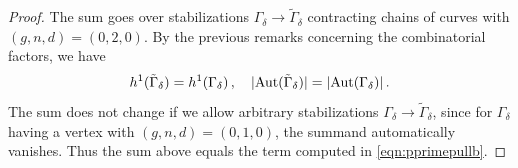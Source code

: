 \documentclass[a4paper,12pt]{article} %
\newcommand{\ca}[1]{{\mathcal{#1}}}
\newcommand{\bd}[1]{{\mathbf{#1}}}
\def\Aut{{\rm Aut}}
\def\E{\mathrm{E}}
\theoremstyle{definition}
\theoremstyle{plain}%
\begin{document}
\begin{proof}
The sum goes over stabilizations $\Gamma_\delta \to \tilde \Gamma_\delta$ contracting chains of curves with $(g,n,d)=(0,2,0)$.
By the previous remarks concerning the combinatorial factors, we have
\[h^1( \tilde \Gamma_\delta) = h^1(\Gamma_\delta)\, , \ \ \ |\Aut(\tilde \Gamma_\delta)| = |\Aut(\Gamma_\delta)|\, . \]
The sum does not change if we allow arbitrary stabilizations $\Gamma_\delta \to \tilde \Gamma_\delta$, since for $\Gamma_\delta$ having a vertex with $(g,n,d)=(0,1,0)$, the summand automatically vanishes. Thus the sum above equals the term computed in \eqref{eqn:pprimepullb}. 
\end{proof}
\end{document}
